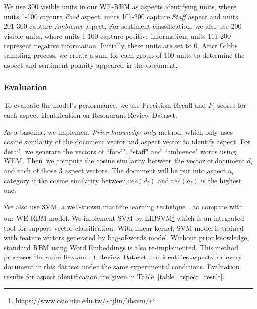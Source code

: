 We use 300 visible units in our WE-RBM as aspects identifying units, where units 1-100 capture \textit{Food} aspect, units 101-200 capture \textit{Staff} aspect and units 201-300 capture \textit{Ambience} aspect.
For sentiment classification, we also use 200 visible units, where units 1-100 capture positive information, units 101-200 represent negative information.
Initially, these units are set to 0.
After Gibbs sampling process, we create a sum for each group of 100 units to determine the aspect and sentiment polarity appeared in the document.


\subsubsection{Evaluation}

To evaluate the model's performance, we use Precision, Recall and $F_1$ scores for each aspect identification on Restaurant Review Dataset.

As a baseline, we implement \textit{Prior knowledge only} method, which only uses cosine similarity of the document vector and aspect vector to identify aspect.
For detail, we generate the vectors of ``food", ``staff" and ``ambience" words using WEM.
Then, we compute the cosine similarity between the vector of document $d_i$ and each of those 3 aspect vectors.
The document will be put into aspect $a_i$ category if the cosine similarity between $vec(d_i)$ and $vec(a_i)$ is the highest one.

We also use SVM, a well-known machine learning technique~\cite{libsvm}, to compare with our WE-RBM model.
We implement SVM by LIBSVM\footnote{\url{https://www.csie.ntu.edu.tw/~cjlin/libsvm/}} which is an integrated tool for support vector classification.
With linear kernel, SVM model is trained with feature vectors generated by bag-of-words model.
Without prior knowledge, standard RBM using Word Embeddings is also re-implemented.
This method processes the same Restaurant Review Dataset and identifies aspects for every document in this dataset under the same experimental conditions.
Evaluation results for aspect identification are given in Table~\ref{table_aspect_result}.

